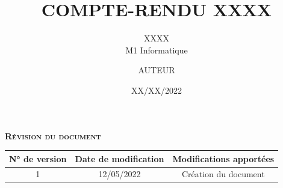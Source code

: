 \documentclass[oneside,12pt]{scrartcl}
\title{COMPTE-RENDU XXXX}
\subtitle{XXXX \\ M1 Informatique}
\author{AUTEUR}
\date{XX/XX/2022}
\begin{document}

\thispagestyle{empty} %

\newpage

\begin{center}
\textsc{\Large \textbf{Révision du document}}
\end{center}
\vspace{2cm}
\begin{center}
\begin{tabular}{|c|c|c|}
    \hline
  N° de version & Date de modification & Modifications apportées  \\
    \hline
    1 & 12/05/2022 & Création du document\\
    \hline
\end{tabular}
\end{center}

\newpage
{} %
{
\renewcommand*\contentsname{Sommaire}
\tableofcontents
}

\clearpage


\printglossary[title=Glossaire,nonumberlist]




\end{document}

